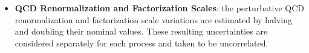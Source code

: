 \begin{itemize}
  \item \textbf{QCD Renormalization and Factorization Scales}: the perturbative QCD renormalization and factorization scale variations are estimated by halving and doubling their nominal values. These resulting uncertainties are considered separately for each process and taken to be uncorrelated.
\end{itemize}
